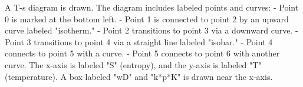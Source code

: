 A T-s diagram is drawn. The diagram includes labeled points and curves:  
- Point 0 is marked at the bottom left.  
- Point 1 is connected to point 2 by an upward curve labeled "isotherm."  
- Point 2 transitions to point 3 via a downward curve.  
- Point 3 transitions to point 4 via a straight line labeled "isobar."  
- Point 4 connects to point 5 with a curve.  
- Point 5 connects to point 6 with another curve.  
The x-axis is labeled "S" (entropy), and the y-axis is labeled "T" (temperature).  
A box labeled "wD" and "k*p*K" is drawn near the x-axis.